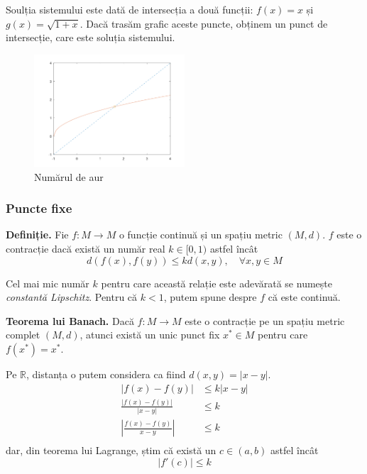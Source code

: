 \documentclass{exam}
\begin{document}
\newpage
Soulția sistemului este dată de intersecția a două funcții: $f(x) = x$ și
$g(x) = \sqrt{1 + x}$. Dacă trasăm grafic aceste puncte, obținem un punct de
intersecție, care este soluția sistemului.

\begin{figure}[h]
	\centering
	\includegraphics[width=0.5\textwidth]{goldengraph}
	\caption{Numărul de aur}
	\label{fig:1}
\end{figure}

\subsubsection{Puncte fixe}

\textbf{Definiție.} Fie $f: M \rightarrow M$ o funcție continuă și un spațiu
metric $(M, d)$. $f$ este o contracție dacă există un număr real $k \in [0, 1)$
astfel încât
\begin{equation*}
	d(f(x), f(y)) \leq k d(x, y), \quad \forall x, y \in M
\end{equation*}

Cel mai mic număr $k$ pentru care această relație este adevărată se numește
\textit{constantă Lipschitz}. Pentru că $k < 1$, putem spune despre $f$ că este
continuă.

\textbf{Teorema lui Banach.} Dacă $f: M \rightarrow M$ este o contracție pe un
spațiu metric complet $(M, d)$, atunci există un unic punct fix $x^* \in M$
pentru care $f(x^*) = x^*$.

Pe $\mathbb{R}$, distanța o putem considera ca fiind $d(x, y) = |x - y|$.
\begin{align*}
	|f(x) - f(y)|                 & \leq k |x - y| \\
	\frac{|f(x) - f(y)|}{|x - y|} & \leq k         \\
	|\frac{f(x) - f(y)}{x - y}|   & \leq k         \\
\end{align*}
dar, din teorema lui Lagrange, știm că există un $c \in (a, b)$ astfel încât
\begin{equation*}
	|f'(c)| \leq k
\end{equation*}
\end{document}
